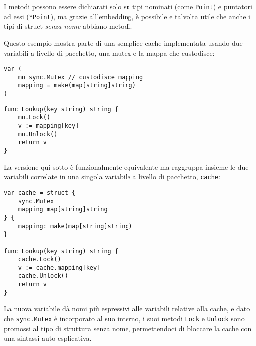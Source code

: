 \documentclass[../../thesis.tex]{subfiles}
\begin{document}
    I metodi possono essere dichiarati solo su tipi nominati (come \verb"Point") e puntatori ad essi (\verb"*Point"), ma grazie all'embedding, è possibile e talvolta utile che anche i tipi di struct \textit{senza nome} abbiano metodi.
    \hfill \vspace{12pt}

    Questo esempio mostra parte di una semplice cache implementata usando due variabili a livello di pacchetto, una mutex e la mappa che custodisce:
    \begin{lstlisting}[frame = single, label = {lst:lstlisting5-3.8}]
var (
    mu sync.Mutex // custodisce mapping
    mapping = make(map[string]string)
)
    \end{lstlisting}
    \clearpage
    \newpage
    \begin{lstlisting}[frame = single, label = {lst:lstlisting5-3.9}]
func Lookup(key string) string {
    mu.Lock()
    v := mapping[key]
    mu.Unlock()
    return v
}
    \end{lstlisting}
    La versione qui sotto è funzionalmente equivalente ma raggruppa insieme le due variabili correlate in una singola variabile a livello di pacchetto, \verb"cache":
    \begin{lstlisting}[frame = single, label = {lst:lstlisting5-3.10}]
var cache = struct {
    sync.Mutex
    mapping map[string]string
} {
    mapping: make(map[string]string)
}

func Lookup(key string) string {
    cache.Lock()
    v := cache.mapping[key]
    cache.Unlock()
    return v
}
    \end{lstlisting}
    La nuova variabile dà nomi più espressivi alle variabili relative alla cache, e dato che \verb"sync.Mutex" è incorporato al suo interno, i suoi metodi \verb"Lock" e \verb"Unlock" sono promossi al tipo di struttura senza nome, permettendoci di bloccare la cache con una sintassi auto-esplicativa.
\end{document}
